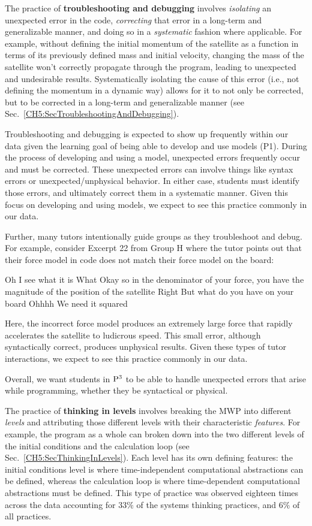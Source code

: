 \documentclass{msuphddissertation}
\begin{document}
\begin{doublespace}
The practice of \textbf{troubleshooting and debugging} involves \textit{isolating} an unexpected error in the code, \textit{correcting} that error in a long-term and generalizable manner, and doing so in a \textit{systematic} fashion where applicable.  For example, without defining the initial momentum of the satellite as a function in terms of its previously defined mass and initial velocity, changing the mass of the satellite won't correctly propagate through the program, leading to unexpected and undesirable results.  Systematically isolating the cause of this error (i.e., not defining the momentum in a dynamic way) allows for it to not only be corrected, but to be corrected in a long-term and generalizable manner (see Sec.~\ref{CH5:SecTroubleshootingAndDebugging}).

Troubleshooting and debugging is expected to show up frequently within our data given the learning goal of being able to develop and use models (P1).  During the process of developing and using a model, unexpected errors frequently occur and must be corrected.  These unexpected errors can involve things like syntax errors or unexpected/unphysical behavior.  In either case, students must identify those errors, and ultimately correct them in a systematic manner.  Given this focus on developing and using models, we expect to see this practice commonly in our data.

Further, many tutors intentionally guide groups as they troubleshoot and debug.  For example, consider Excerpt 22 from Group H where the tutor points out that their force model in code does not match their force model on the board: \begin{description}
\TA Oh I see what it is
\SB What
\TA Okay so in the denominator of your force, you have the magnitude of the position of the satellite
\SB Right
\TA But what do you have on your board
\SB Ohhhh
\SC We need it squared
\end{description}  Here, the incorrect force model produces an extremely large force that rapidly accelerates the satellite to ludicrous speed.  This small error, although syntactically correct, produces unphysical results.  Given these types of tutor interactions, we expect to see this practice commonly in our data.

Overall, we want students in ${\rm P}^{3}$ to be able to handle unexpected errors that arise while programming, whether they be syntactical or physical.

The practice of \textbf{thinking in levels} involves breaking the MWP into different \textit{levels} and attributing those different levels with their characteristic \textit{features}.  For example, the program as a whole can broken down into the two different levels of the initial conditions and the calculation loop (see Sec.~\ref{CH5:SecThinkingInLevels}).  Each level has its own defining features: the initial conditions level is where time-independent computational abstractions can be defined, whereas the calculation loop is where time-dependent computational abstractions must be defined.  This type of practice was observed eighteen times across the data  accounting for $33\%$ of the systems thinking practices, and $6\%$ of all practices.


\end{doublespace}
\end{document}
